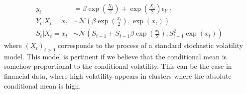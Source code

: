 \documentclass[11pt,a4,twosided,singlespacing,titlepagenumber=on]{scrreprt}
\numberwithin{equation}{chapter} %
\theoremstyle{remark}
\begin{document}
\begin{align*}
y_t 			 &= \beta \exp\left(\frac{X_t}{2}\right) + \exp\left(\frac{X_t}{2}\right) \epsilon_{Y,t} \\
Y_t | X_t = x_t  &\sim \mathcal{N} \left(\beta \exp\left(\frac{x_t}{2}\right) , \exp\left(x_t\right) \right) \\
S_t | X_t = x_t  &\sim \mathcal{N} \left(S_{t-1} + S_{t-1} \beta \exp\left(\frac{x_t}{2}\right), S_{t-1}^2 \exp\left(x_t\right) \right)
\end{align*}
where $(X_t)_{t>0}$ corresponds to the process of a standard stochastic volatility model. This model is pertinent if we believe that the conditional mean is somehow proportional to the conditional volatility. This can be the case in financial data, where high volatility appears in clusters where the absolute conditional mean is high.
\end{document}
